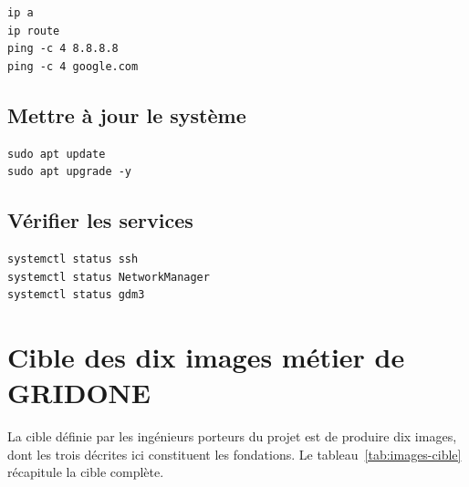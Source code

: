 \begin{lstlisting}[basicstyle=\ttfamily\footnotesize, frame=single]
ip a
ip route
ping -c 4 8.8.8.8
ping -c 4 google.com
\end{lstlisting}

\subsection{Mettre à jour le système}

\begin{lstlisting}[basicstyle=\ttfamily\footnotesize, frame=single]
sudo apt update
sudo apt upgrade -y
\end{lstlisting}

\subsection{Vérifier les services}

\begin{lstlisting}[basicstyle=\ttfamily\footnotesize, frame=single]
systemctl status ssh
systemctl status NetworkManager
systemctl status gdm3
\end{lstlisting}

\section{Cible des dix images métier de GRIDONE}

La cible définie par les ingénieurs porteurs du projet est de produire dix images, dont les trois décrites ici constituent les fondations. Le tableau~\ref{tab:images-cible} récapitule la cible complète.

